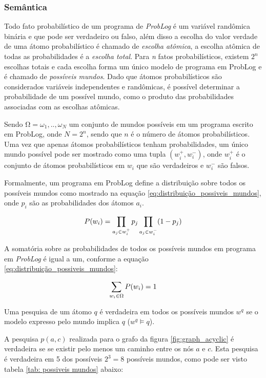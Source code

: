 \documentclass[
	12pt,				%
    oneside,			%
	a4paper,			%
	english,			%
	french,				%
	spanish,			%
	brazil,				%
	]{abntex2}
\begin{document}
\subsubsection{Semântica}

Todo fato probabilístico de um programa de \textit{ProbLog} é um variável randômica binária e que pode ser verdadeiro ou falso, além disso a escolha do valor verdade de uma átomo probabilístico é chamado de \textit{escolha atômica}, a escolha atômica de todas as probabilidades é a \textit{escolha total}. Para \textit{n} fatos probabilísticos, existem $2^n$ escolhas totais e cada escolha forma um único modelo de programa em ProbLog e é chamado de \textit{possíveis mundos}. Dado que átomos probabilísticos são considerados variáveis independentes e randômicas, é possível determinar a probabilidade de um possível mundo, como o produto das probabilidades associadas com as escolhas atômicas. 

Sendo $Ω = {ω_1, .., ω_N }$ um conjunto de mundos possíveis em um programa escrito em ProbLog, onde $N=2^n$, sendo que $n$ é o número de átomos probabilísticos. Uma vez que apenas átomos probabilísticos tenham probabilidades, um  único mundo possível pode ser mostrado como uma tupla $(w_i^+, w_i^-)$, onde $w_i^+$ é o conjunto de átomos probabilísticos em $w_i$ que são verdadeiros e $w_i^-$ são falsos.

Formalmente, um programa em ProbLog define a distribuição sobre todos os possíveis mundos como mostrado na equação \ref{eq:distribuição_possiveis_mundos}, onde $p_i$ são as probabilidades dos átomos $a_i$.

\begin{equation}
\centering
    P(w_i)= \prod_{a_j\in w_i^+} p_j \prod_{a_j\in w_i^-} (1-p_j)
    \label{eq:distribuição_possiveis_mundos}
\end{equation}


A somatória sobre as probabilidades de todos os possíveis mundos em programa em \textit{ProbLog} é igual a um, conforme a equação \ref{eq:distribuição_possiveis_mundos}: 

\begin{equation}
\centering
    \sum_{w_i \in \Omega } {P(w_i)=1}
    \label{eq:distribuição_possiveis_mundos}
\end{equation}

Uma pesquisa de um átomo $q$ é verdadeira em todos os possíveis mundos $w^q$ se o modelo expresso pelo mundo implica $q$ ($w^q \models q$).

A pesquisa $p(a, c)$ realizada para o grafo da figura \ref{fig:graph_acyclic} é verdadeira se se existir pelo menos um caminho entre os nós $a$ e $c$. Esta pesquisa é verdadeira em 5 dos possíveis $2^3=8$ possíveis mundos, como pode ser visto tabela \ref{tab: possiveis mundos} abaixo:
\end{document}
